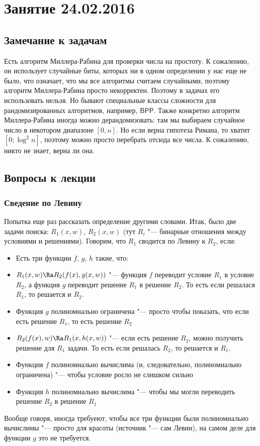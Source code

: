 \chapter{Занятие 24.02.2016}
\section{Замечание к задачам}
	Есть алгоритм Миллера-Рабина для проверки числа на простоту.
	К сожалению, он использует случайные биты, которых ни в одном определении у нас еще не было,
	что означает, что мы все алгоритмы считаем случайными, поэтому алгоритм Миллера-Рабина просто некорректен.
	Поэтому в задачах его использовать нельзя.
	Но бывают специальные классы сложности для рандомизированных алгоритмов, например, $\mathsf{BPP}$.
	Также конкретно алгоритм Миллера-Рабина иногда можно дерандомизовать: там мы выбираем
	случайное число в некотором диапазоне $[0, n]$.
	Но если верна гипотеза Римана, то хватит $[0; \log^2 n]$, поэтому можно просто перебрать отсюда все числа.
	К сожалению, никто не знает, верна ли она.

\section{Вопросы к лекции}
\subsection{Сведение по Левину}
	Попытка еще раз рассказать определение другими словами.
	Итак, было две задачи поиска: $R_1(x, w)$, $R_2(x, w)$ (тут $R_i$ "--- бинарные отношения между условиями и решениями).
	Говорим, что $R_1$ сводится по Левину к $R_2$, если:
	\begin{itemize}
		\item Есть три функции $f$, $g$, $h$ такие, что:
		\item
			$R_1(x, w) \Ra R_2(f(x), g(x, w))$ "--- функция $f$ переводит условие $R_1$ в условие $R_2$,
			а функция $g$ переводит решение $R_1$ в решение $R_2$.
			То есть если решалася $R_1$, то решается и $R_2$.
		\item
			Функция $g$ полиномиально ограничена "--- просто чтобы показать, что если есть решение $R_1$, то есть решение $R_2$
		\item
			$R_2(f(x), w) \Ra R_1(x, h(x, w))$ "--- если есть решение $R_2$, можно
			получить решение для $R_1$ задачи.
			То есть если решалась $R_2$, то решается и $R_1$.
		\item
			Функция $f$ полиномиально вычислима (и, следовательно, полиномиально ограничена) "--- чтобы условие росло не слишком сильно
		\item
			Функция $h$ полиномиально вычислима "--- чтобы мы могли переводить решение $R_2$ в решение $R_1$
	\end{itemize}
	Вообще говоря, иногда требуеют, чтобы все три функции были полиномиально вычислимы "--- просто для красоты
	(источник "--- сам Левин), на самом деле для функции $g$ это не требуется.

